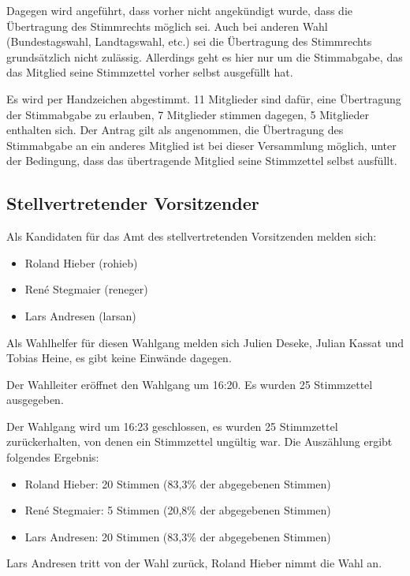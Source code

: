 \documentclass[a4paper,12pt]{scrartcl}
\begin{document}
Dagegen wird angeführt, dass vorher nicht angekündigt wurde, dass die
Übertragung des Stimmrechts möglich sei. Auch bei anderen Wahl (Bundestagswahl,
Landtagswahl, etc.) sei die Übertragung des Stimmrechts grundsätzlich nicht
zulässig. Allerdings geht es hier nur um die Stimmabgabe, das das Mitglied seine
Stimmzettel vorher selbst ausgefüllt hat.

Es wird per Handzeichen abgestimmt. 11 Mitglieder sind dafür, eine Übertragung
der Stimmabgabe zu erlauben, 7 Mitglieder stimmen dagegen, 5 Mitglieder
enthalten sich. Der Antrag gilt als angenommen, die Übertragung des Stimmabgabe
an ein anderes Mitglied ist bei dieser Versammlung möglich, unter der Bedingung,
dass das übertragende Mitglied seine Stimmzettel selbst ausfüllt.

\subsection{Stellvertretender Vorsitzender}
Als Kandidaten für das Amt des stellvertretenden Vorsitzenden melden sich:
\begin{itemize}
  \item Roland Hieber (rohieb)
  \item René Stegmaier (reneger)
  \item Lars Andresen (larsan)
\end{itemize}

Als Wahlhelfer für diesen Wahlgang melden sich Julien Deseke, Julian Kassat und
Tobias Heine, es gibt keine Einwände dagegen.

Der Wahlleiter eröffnet den Wahlgang um 16:20. Es wurden 25 Stimmzettel
ausgegeben.

Der Wahlgang wird um 16:23 geschlossen, es wurden 25 Stimmzettel zurückerhalten,
von denen ein Stimmzettel ungültig war. Die Auszählung ergibt folgendes
Ergebnis:

\begin{itemize}
  \item Roland Hieber: 20 Stimmen (83{,}3\% der abgegebenen Stimmen)
  \item René Stegmaier: 5 Stimmen (20{,}8\% der abgegebenen Stimmen)
  \item Lars Andresen: 20 Stimmen (83{,}3\% der abgegebenen Stimmen)
\end{itemize}

Lars Andresen tritt von der Wahl zurück, Roland Hieber nimmt die Wahl an.
\end{document}
